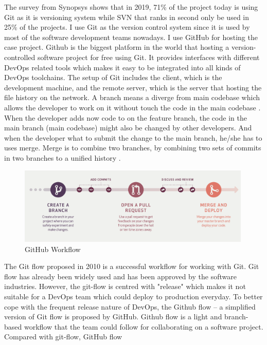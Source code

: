 The survey \cite{CompareR31:online} from Synopsys shows that in 2019, 71\% of the project today is using Git as it is versioning system while SVN that ranks in second only be used in 25\% of the projects. I use Git as the version control system since it is used by most of the software development teams nowadays. I use GitHub for hosting the case project. Github is the biggest platform in the world that hosting a version-controlled software project for free using Git. It provides interfaces with different DevOps related tools which makes it easy to be integrated into all kinds of DevOps toolchains. The setup of Git includes the client, which is the development machine, and the remote server, which is the server that hosting the file history on the network. A branch means a diverge from main codebase which allows the developer to work on it without touch the code in the main codebase \cite{GitBranc33:online}. When the developer adds now code to on the feature branch, the code in the main branch (main codebase) might also be changed by other developers. And when the developer what to submit the change to the main branch, he/she has to uses merge. Merge is to combine two branches, by combining two sets of commits in two branches to a unified history \cite{GitMerge0:online}. 
\begin{figure}[h]
\centering
\includegraphics[width=0.99\textwidth]{pics/git.png}
\caption{GitHub Workflow \cite{guides2013understanding}}
\label{fig:git}
\end{figure}
\par
The Git flow \cite{driessen2010successful} proposed in 2010 is a successful workflow for working with Git. Git flow has already been widely used and has been approved by the software industries. However, the git-flow is centred with "release" which makes it not suitable for a DevOps team which could deploy to production everyday\cite{guides2013understanding}. To better cope with the frequent release nature of DevOps, the Github flow -- a simplified version of Git flow is proposed by GitHub. Github flow is a light and branch-based workflow that the team could follow for collaborating on a software project. Compared with git-flow, GitHub flow 
